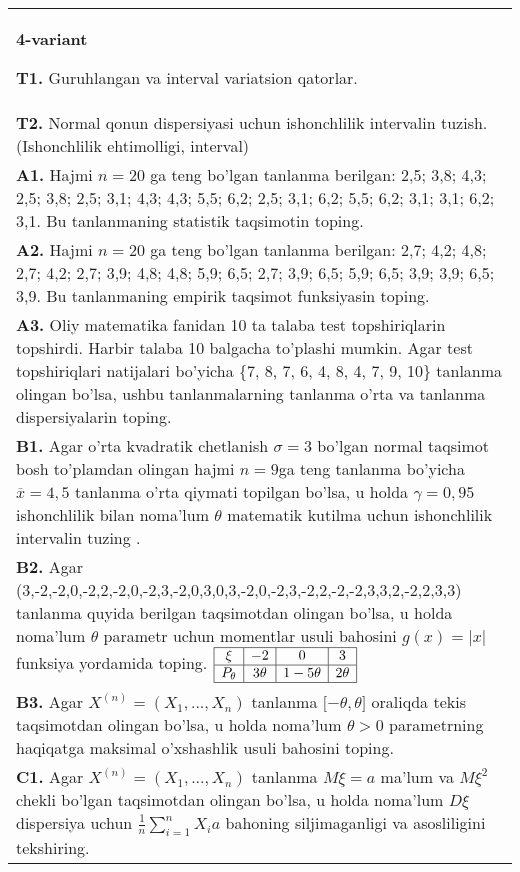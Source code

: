 \documentclass{article}
\begin{document}
\begin{tabular}{m{17cm}}
\textbf{4-variant}
\newline

\textbf{T1.} 
Guruhlangan va interval variatsion qatorlar.
\\
\textbf{T2.} 
Normal qonun dispersiyasi uchun ishonchlilik intervalin tuzish. (Ishonchlilik ehtimolligi, interval)
\\
\textbf{A1.} 
Hajmi \(n = 20\) ga teng bo'lgan tanlanma berilgan: 2,5; 3,8; 4,3; 2,5; 3,8; 2,5; 3,1; 4,3; 4,3; 5,5; 6,2; 2,5; 3,1; 6,2; 5,5; 6,2; 3,1; 3,1; 6,2; 3,1. Bu tanlanmaning statistik taqsimotin toping.
\\
\textbf{A2.} 
Hajmi \(n = 20\) ga teng bo'lgan tanlanma berilgan: 2,7; 4,2; 4,8; 2,7; 4,2; 2,7; 3,9; 4,8; 4,8; 5,9; 6,5; 2,7; 3,9; 6,5; 5,9; 6,5; 3,9; 3,9; 6,5; 3,9. Bu tanlanmaning empirik taqsimot funksiyasin toping.
\\
\textbf{A3.} 
Oliy matematika fanidan 10 ta talaba test topshiriqlarin topshirdi. Harbir talaba 10 balgacha to'plashi mumkin. Agar test topshiriqlari natijalari bo'yicha \{7, 8, 7, 6, 4, 8, 4, 7, 9, 10\} tanlanma olingan bo'lsa, ushbu tanlanmalarning tanlanma o'rta va tanlanma dispersiyalarin toping.
\\
\textbf{B1.} 
Agar o'rta kvadratik chetlanish \(\sigma = 3\) bo'lgan normal taqsimot bosh to'plamdan olingan hajmi \(n = 9\)ga teng tanlanma bo'yicha \(\overline{x} = 4,5\) tanlanma o'rta qiymati topilgan bo'lsa, u holda \(\gamma = 0,95\) ishonchlilik bilan noma'lum \(\theta\) matematik kutilma uchun ishonchlilik intervalin tuzing .
\\
\textbf{B2.} 
Agar (3,-2,-2,0,-2,2,-2,0,-2,3,-2,0,3,0,3,-2,0,-2,3,-2,2,-2,-2,3,3,2,-2,2,3,3) tanlanma quyida berilgan taqsimotdan olingan bo'lsa, u holda noma'lum \(\theta\) parametr uchun momentlar usuli bahosini \(g(x) = |x|\) funksiya yordamida toping.
$\begin{array}{|c|c|c|c|}
    \hline
    \xi & -2 & 0 & 3 \\
    \hline
    P_{\theta} & 3\theta & 1 - 5\theta & 2\theta \\
    \hline
\end{array}$
\\
\textbf{B3.} 
Agar \(X^{(n)} = \left( X_{1},...,X_{n} \right)\) tanlanma \(\lbrack - \theta,\theta\rbrack\) oraliqda tekis taqsimotdan olingan bo'lsa, u holda noma'lum \(\theta > 0\) parametrning haqiqatga maksimal o'xshashlik usuli bahosini toping.
\\
\textbf{C1.} 
Agar \(X^{(n)} = \left( X_{1},...,X_{n} \right)\) tanlanma \(M\xi = a\) ma'lum va \(M\xi^{2}\) chekli bo'lgan taqsimotdan olingan bo'lsa, u holda noma'lum \(D\xi\) dispersiya uchun \(\frac{1}{n}\sum_{i = 1}^{n}{X_{i}a}\) bahoning siljimaganligi va asosliligini tekshiring.

\end{tabular}
\end{document}
